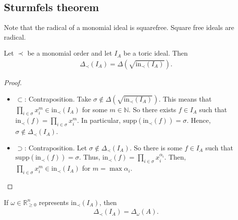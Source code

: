 \documentclass[a4paper, 11pt]{article}
\begin{document}
\subsection{Sturmfels theorem}

Note that the radical of a monomial ideal is squarefree. Square free ideals are radical.

\begin{prop}
  Let \( \prec \) be a monomial order and let \( I_A \) be a toric ideal. Then 
  \begin{align*}
    \Delta_\prec(I_A) = \Delta(\sqrt{\mathrm{in}_\prec(I_A)}).
  \end{align*}
\end{prop}

\begin{proof}\(  \)
  \begin{itemize}
    \item \( \subset \): Contraposition. Take \( \sigma \notin \Delta(\sqrt{\mathrm{in}_\prec(I_A)}) \). This means that \( \prod_{i \in \sigma} x_i^m \in {\mathrm{in}_\prec(I_A)} \) for some \( m \in \mathbb N \). So there exists \( f \in I_A \) such that \( \mathrm{in}_\prec(f) = \prod_{i \in \sigma} x_i^m \). In particular, \( \mathrm{supp}(\mathrm{in}_\prec(f)) = \sigma \). Hence, \( \sigma \notin \Delta_\prec(I_A) \).
    \item \( \supset \): Contraposition. Let \( \sigma \notin \Delta_{\prec}(I_A) \). So there is some \( f \in I_A \) such that \( \mathrm{supp}(\mathrm{in}_\prec(f)) = \sigma \). Thus, \( \mathrm{in}_\prec(f) = \prod_{i \in \sigma} x_i^{\alpha_i} \). Then, \( \prod_{i \in \sigma} x_i^m  \in \mathrm{in}_\prec(I_A)\) for \( m = \max \alpha_i \).
  \end{itemize}
\end{proof}

\begin{mdframed}
\begin{thm}[Sturmfels 1991]
  If \( \omega \in \mathbb R^n_{\geq 0} \) represents \( \mathrm{in}_\prec(I_A) \), then 
  \begin{align*}
    \Delta_\prec(I_A) = \Delta_\omega(A).
  \end{align*}
\end{thm}
\end{mdframed}
\end{document}
